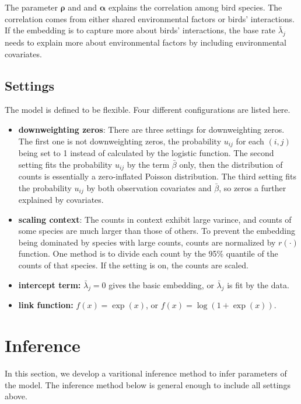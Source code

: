 \documentclass{article}
\newcommand{\wt}{\boldsymbol{\rho}}
\newcommand{\emb}{\boldsymbol{\alpha}}
\begin{document}
The parameter $\wt$ and and $\emb$ explains the correlation among bird species. The correlation comes from either shared environmental factors or birds' interactions. If the embedding is to capture more about birds' interactions, the base rate $\bar{\lambda}_{j}$ needs to explain more about environmental factors by including environmental covariates. 


\subsection{Settings}

The model is defined to be flexible. Four different configurations are listed here.  
\begin{itemize}


\item[]{\bf downweighting zeros}: There are three settings for downweighting zeros. The first one is not downweighting zeros, the probability $u_{ij}$ for each $(i, j)$ being set to 1 instead of calculated by the logistic function. The second setting fits the probability $u_{ij}$ by the term $\bar{\beta}$ only, then the distribution of counts is essentially a zero-inflated Poisson distribution. The third setting fits the probability $u_{ij}$ by both observation covariates and $\bar{\beta}$, so zeros a further explained by covariates.    

\item[]{\bf scaling context}: The counts in context exhibit large varince, and counts of some species are much larger than those of others. To prevent the embedding being dominated by species with large counts, counts are normalized by $r(\cdot)$ function. One method is to divide each count by the 95\% quantile of the counts of that species. If the setting is on, the counts are scaled.

\item[]{\bf intercept term:} $\bar{\lambda}_{j} = 0$ gives the basic embedding, or $\bar{\lambda}_{j}$ is fit by the data. 

\item[]{\bf link function:} $f(x) = \exp(x)$, or $f(x) = \log(1 + \exp(x))$.
\end{itemize}

\section{Inference}

In this section, we develop a varitional inference method to infer parameters of the model. The inference method below is general enough to include all settings above.
\end{document}
